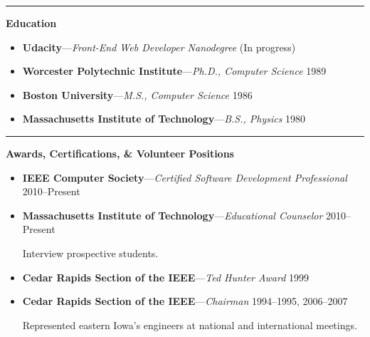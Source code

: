 \documentclass[twoside,10pt]{article}
\newcommand{\mycategory}[1]{{\color{mycategorycolor}\large \textbf{#1}}}
\newcommand{\myrule}{\begin{center}\rule{18cm}{0.04cm}\end{center}}
\newcommand{\myeducation}[3]{\textbf{#1}---\emph{#2} \hfill #3}
\newcommand{\myaward}[3]{\textbf{#1}---\emph{#2} \hfill #3}
\begin{document}
\myrule

\mycategory{Education}

\begin{itemize}[label={$\triangleright$}] \itemsep1pt \parskip0pt 
  \item \myeducation{Udacity}{Front-End Web Developer Nanodegree}{(In progress)}
  \item \myeducation{Worcester Polytechnic Institute}{Ph.D., Computer Science}{1989}
  \item \myeducation{Boston University}{M.S., Computer Science}{1986}
  \item \myeducation{Massachusetts Institute of Technology}{B.S., Physics}{1980}
  \end{itemize}

\myrule

\mycategory{Awards, Certifications, \& Volunteer Positions} 

\begin{itemize}[label={$\triangleright$}] \itemsep1pt \parskip0pt 
  \item \myaward{IEEE Computer Society}{Certified Software Development Professional}{2010--Present}
  \item \myaward{Massachusetts Institute of Technology}{Educational Counselor}{2010--Present}

    Interview prospective students.

  \item \myaward{Cedar Rapids Section of the IEEE}{Ted Hunter Award}{1999}
  \item \myaward{Cedar Rapids Section of the IEEE}{Chairman}{1994--1995, 2006--2007}  

    Represented eastern Iowa's engineers at national and international meetings.

  \end{itemize}




\end{document}
